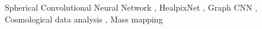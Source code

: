 \documentclass[final,twocolumn,3p,times,authoryear]{elsarticle}
\newcommand{\nati}[1]{{\color[rgb]{.1,.6,.1}{#1}}}
\newcommand{\todo}[1]{{\color[rgb]{.6,.1,.6}{#1}}}
\newcommand{\1}{\b{1}}              %
\newcommand{\0}{\b{0}}              %
\begin{document}
\begin{frontmatter}
\begin{abstract}
\end{abstract}

\begin{keyword}
Spherical Convolutional Neural Network \sep
HealpixNet \sep
Graph CNN \sep
Cosmological data analysis \sep
Mass mapping
\end{keyword}

\end{frontmatter}

\end{document}
